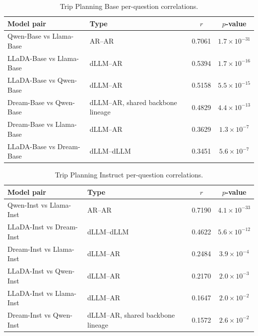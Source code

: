 \begin{table}[H]
\centering
\caption{Trip Planning Base per-question correlations.}
\label{tab:trip-base-corr}
\scriptsize
\begin{tabular}{llcc}
\toprule
\textbf{Model pair} & \textbf{Type} & \textbf{$r$} & \textbf{$p$-value} \\
\midrule
Qwen-Base vs Llama-Base & AR--AR & 0.7061 & $1.7\times10^{-31}$ \\
LLaDA-Base vs Llama-Base & dLLM--AR & 0.5394 & $1.7\times10^{-16}$ \\
LLaDA-Base vs Qwen-Base & dLLM--AR & 0.5158 & $5.5\times10^{-15}$ \\
Dream-Base vs Qwen-Base & dLLM--AR, shared backbone lineage & 0.4829 & $4.4\times10^{-13}$ \\
Dream-Base vs Llama-Base & dLLM--AR & 0.3629 & $1.3\times10^{-7}$ \\
LLaDA-Base vs Dream-Base & dLLM--dLLM & 0.3451 & $5.6\times10^{-7}$ \\
\bottomrule
\end{tabular}
\end{table}

\begin{table}[H]
\centering
\caption{Trip Planning Instruct per-question correlations.}
\label{tab:trip-inst-corr}
\scriptsize
\begin{tabular}{llcc}
\toprule
\textbf{Model pair} & \textbf{Type} & \textbf{$r$} & \textbf{$p$-value} \\
\midrule
Qwen-Inst vs Llama-Inst & AR--AR & 0.7190 & $4.1\times10^{-33}$ \\
LLaDA-Inst vs Dream-Inst & dLLM--dLLM & 0.4622 & $5.6\times10^{-12}$ \\
Dream-Inst vs Llama-Inst & dLLM--AR & 0.2484 & $3.9\times10^{-4}$ \\
LLaDA-Inst vs Qwen-Inst & dLLM--AR & 0.2170 & $2.0\times10^{-3}$ \\
LLaDA-Inst vs Llama-Inst & dLLM--AR & 0.1647 & $2.0\times10^{-2}$ \\
Dream-Inst vs Qwen-Inst & dLLM--AR, shared backbone lineage & 0.1572 & $2.6\times10^{-2}$ \\
\bottomrule
\end{tabular}
\end{table}
